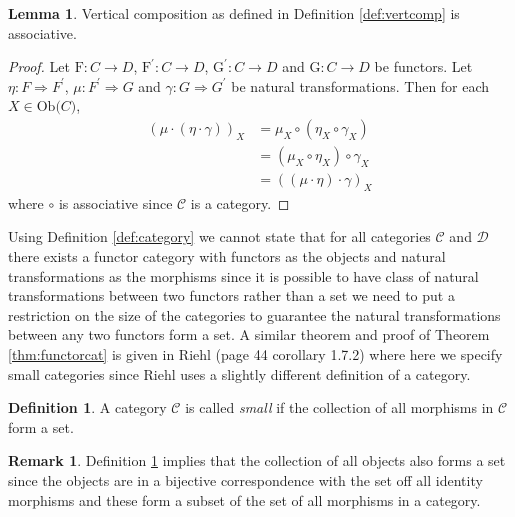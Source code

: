 \documentclass[11pt,a4paper]{article}
\theoremstyle{definition}
\newtheorem{lemma}[thm]{Lemma}
\newtheorem{definition}[thm]{Definition}
\newtheorem{remark}[thm]{Remark}
\newcommand\ob[1]{\mathrm{Ob(}#1\mathrm{)}}
\newcommand\cat[1]{\mathscr{#1}}
\newcommand\func[3]{\mathrm{#1}\colon#2\rightarrow#3}
\newcommand\nattran[3]{#1\colon#2\Rightarrow#3}
\numberwithin{equation}{section}
\begin{document}
\begin{lemma}
\label{lem:vertcomassociative}
Vertical composition as defined in Definition \ref{def:vertcomp} is associative.
\end{lemma}
\begin{proof}
Let $\func{F}{C}{D}$, $\func{F^{\prime}}{C}{D}$, $\func{G^{\prime}}{C}{D}$ and $\func{G}{C}{D}$ be functors. Let $\nattran{\eta}{F}{F^{\prime}}$, $\nattran{\mu}{F^{\prime}}{G}$ and $\nattran{\gamma}{G}{G^{\prime}}$ be natural transformations. Then for each $X\in\ob{C}$,
\begin{align*}
    (\mu\cdot(\eta\cdot\gamma))_{X}&= \mu_{X}\circ(\eta_{X}\circ\gamma_{X})\\
    &= (\mu_{X}\circ\eta_{X})\circ\gamma_{X}\\
    &= ((\mu\cdot\eta)\cdot\gamma)_{X}
\end{align*}
where $\circ$ is associative since $\cat{C}$ is a category.
\end{proof}

Using Definition \ref{def:category} we cannot state that for all categories $\cat{C}$ and $\cat{D}$ there exists a functor category with functors as the objects and natural transformations as the morphisms since it is possible to have class of natural transformations between two functors rather than a set we need to put a restriction on the size of the categories to guarantee the natural transformations between any two functors form a set. A similar theorem and proof of Theorem \ref{thm:functorcat} is given in  Riehl \cite{Riehl} (page 44 corollary 1.7.2) where here we specify small categories since Riehl uses a slightly different definition of a category.

\begin{definition}
    \label{def:smallcat}
    A category $\cat{C}$ is called \emph{small} if the collection of all morphisms in $\cat{C}$ form a set.
\end{definition}

\begin{remark}
    Definition \ref{def:smallcat} implies that the collection of all objects also forms a set since the objects are in a bijective correspondence with the set off all identity morphisms and these form a subset of the set of all morphisms in a category.
\end{remark}
\end{document}
